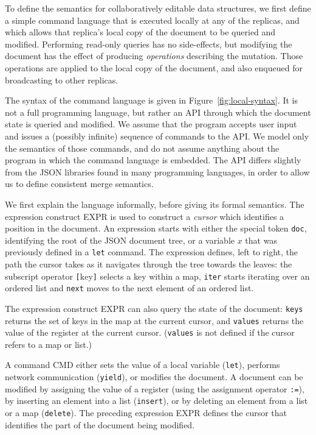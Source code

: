 \documentclass[10pt,journal,compsoc]{IEEEtran}
\begin{document}
To define the semantics for collaboratively editable data structures, we first define a simple command language that is executed locally at any of the replicas, and which allows that replica's local copy of the document to be queried and modified. Performing read-only queries has no side-effects, but modifying the document has the effect of producing \emph{operations} describing the mutation. Those operations are applied to the local copy of the document, and also enqueued for broadcasting to other replicas.

The syntax of the command language is given in Figure~\ref{fig:local-syntax}. It is not a full programming language, but rather an API through which the document state is queried and modified. We assume that the program accepts user input and issues a (possibly infinite) sequence of commands to the API. We model only the semantics of those commands, and do not assume anything about the program in which the command language is embedded. The API differs slightly from the JSON libraries found in many programming languages, in order to allow us to define consistent merge semantics.

We first explain the language informally, before giving its formal semantics. The expression construct EXPR is used to construct a \emph{cursor} which identifies a position in the document. An expression starts with either the special token \texttt{doc}, identifying the root of the JSON document tree, or a variable $x$ that was previously defined in a \texttt{let} command. The expression defines, left to right, the path the cursor takes as it navigates through the tree towards the leaves: the subscript operator \texttt{[}$\mathrm{key}$\texttt{]} selects a key within a map, \texttt{iter} starts iterating over an ordered list and \texttt{next} moves to the next element of an ordered list.

The expression construct EXPR can also query the state of the document: \texttt{keys} returns the set of keys in the map at the current cursor, and \texttt{values} returns the value of the register at the current cursor. (\texttt{values} is not defined if the cursor refers to a map or list.)

A command CMD either sets the value of a local variable (\texttt{let}), performs network communication (\texttt{yield}), or modifies the document. A document can be modified by assigning the value of a register (using the assignment operator \texttt{:=}), by inserting an element into a list (\texttt{insert}), or by deleting an element from a list or a map (\texttt{delete}). The preceding expression EXPR defines the cursor that identifies the part of the document being modified.
\end{document}

